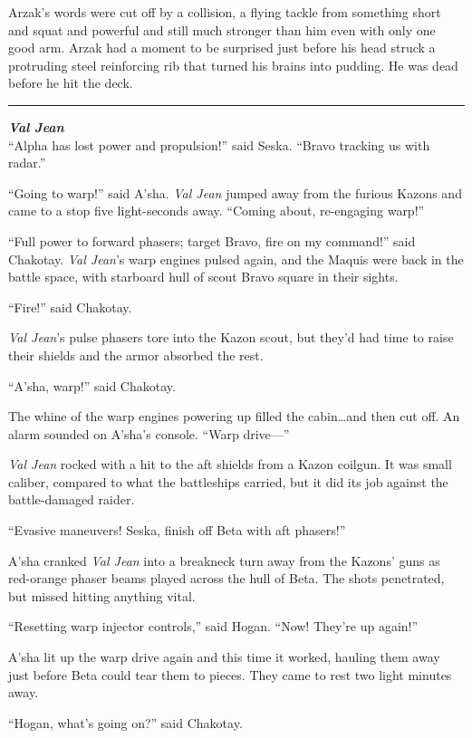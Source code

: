 \documentclass[twoside,letterpaper,12pt]{memoir}
\begin{document}
Arzak's words were cut off by a collision, a flying tackle from something short and squat and powerful and still much stronger than him even with only one good arm. Arzak had a moment to be surprised just before his head struck a protruding steel reinforcing rib that turned his brains into pudding. He was dead before he hit the deck.

\fancybreak{\rule{3cm}{0.4 pt}}
\noindent\textit{\textbf{Val Jean}}\\

``Alpha has lost power and propulsion!'' said Seska. ``Bravo tracking us with radar.''

``Going to warp!'' said A'sha. \textit{Val Jean} jumped away from the furious Kazons and came to a stop five light-seconds away. ``Coming about, re-engaging warp!''

``Full power to forward phasers; target Bravo, fire on my command!'' said Chakotay. \textit{Val Jean}'s warp engines pulsed again, and the Maquis were back in the battle space, with starboard hull of scout Bravo square in their sights.

``Fire!'' said Chakotay.

\textit{Val Jean}'s pulse phasers tore into the Kazon scout, but they’d had time to raise their shields and the armor absorbed the rest.

``A'sha, warp!'' said Chakotay.

The whine of the warp engines powering up filled the cabin\ldots and then cut off. An alarm sounded on A'sha's console. ``Warp drive---''

\textit{Val Jean} rocked with a hit to the aft shields from a Kazon coilgun. It was small caliber, compared to what the battleships carried, but it did its job against the battle-damaged raider.

``Evasive maneuvers! Seska, finish off Beta with aft phasers!''

A'sha cranked \textit{Val Jean} into a breakneck turn away from the Kazons' guns as red-orange phaser beams played across the hull of Beta. The shots penetrated, but missed hitting anything vital.

``Resetting warp injector controls,'' said Hogan. ``Now! They're up again!''

A'sha lit up the warp drive again and this time it worked, hauling them away just before Beta could tear them to pieces. They came to rest two light minutes away.

``Hogan, what's going on?'' said Chakotay.
\end{document}
